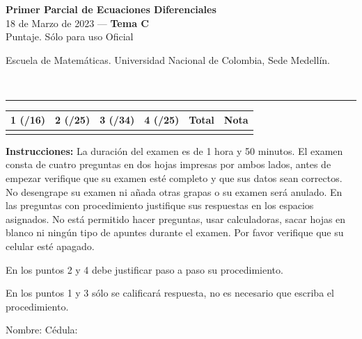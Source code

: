 \documentclass[11pt]{article}
\begin{document}
\noindent
\begin{minipage}[t]{0.62\linewidth}
  {\bfseries\large Primer Parcial de Ecuaciones Diferenciales}\\[2pt]
  {\small 18 de Marzo de 2023 --- \textbf{Tema C}}\\
  {\small Puntaje. Sólo para uso Oficial}
\end{minipage}%
\hfill
\begin{minipage}[t]{0.35\linewidth}
  \raggedleft\small Escuela de Matemáticas. Universidad Nacional de Colombia, Sede Medellín.
\end{minipage}\\[4pt]
\rule{\linewidth}{0.6pt}

\vspace{4pt}
\noindent
\begin{tabular}{|c|c|c|c|c|c|}
\hline
1 (/16) & 2 (/25) & 3 (/34) & 4 (/25) & Total & Nota \\
\hline
 & & & & & \\
\hline
\end{tabular}

\vspace{6pt}
\noindent\textbf{Instrucciones:} La duración del examen es de 1 hora y 50 minutos. El examen consta de cuatro preguntas en dos hojas impresas por ambos lados, antes de empezar verifique que su examen esté completo y que sus datos sean correctos. No desengrape su examen ni añada otras grapas o su examen será anulado. En las preguntas con procedimiento justifique sus respuestas en los espacios asignados. No está permitido hacer preguntas, usar calculadoras, sacar hojas en blanco ni ningún tipo de apuntes durante el examen. Por favor verifique que su celular esté apagado.

\vspace{4pt}
\noindent En los puntos 2 y 4 debe justificar paso a paso su procedimiento.

\noindent En los puntos 1 y 3 sólo se calificará respuesta, no es necesario que escriba el procedimiento.

\vspace{8pt}
\noindent Nombre: \makebox[0.45\linewidth]{\hrulefill} \hfill Cédula: \makebox[0.3\linewidth]{\hrulefill}
\end{document}
